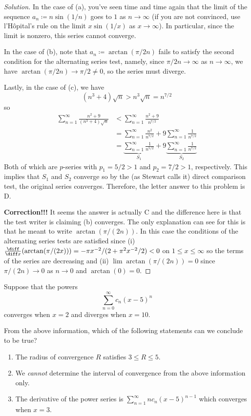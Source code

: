 \begin{proof}[Solution]
In the case of (a), you've seen time and time again that the limit of the
sequence $a_n\coloneqq n\sin(1/n)$ goes to $1$ as $n\to\infty$ (if you are
not convinced, use l'Hôpital's rule on the limit $x\sin(1/x)$ as
$x\to\infty$). In particular, since the limit is nonzero, this series
cannot converge.

In the case of (b), note that $a_n\coloneqq \arctan(\pi/2 n)$ fails to
satisfy the second condition for the alternating series test, namely, since
$\pi/2n\to \infty$ as $n\to\infty$, we have $\arctan(\pi/2 n)\to\pi/2\neq
0$, so the series must diverge.

Lastly, in the case of (c), we have
\[
(n^3+4)\sqrt{n}>n^3\sqrt{n}=n^{7/2}
\]
so
\begin{align*}
\sum_{n=1}^\infty\frac{n^2+9}{(n^3+4)\sqrt{n}}
&<\sum_{n=1}^\infty\frac{n^2+9}{n^{7/2}}\\
&=\sum_{n=1}^\infty\frac{n^2}{n^{7/2}}+
9\sum_{n=1}^\infty\frac{1}{n^{7/2}}\\
&=\underbrace{\sum_{n=1}^\infty\frac{1}{n^{5/2}}}_{S_1}+
9\underbrace{\sum_{n=1}^\infty\frac{1}{n^{7/2}}}_{S_2}
\end{align*}
Both of which are $p$-series with $p_1=5/2>1$ and $p_2=7/2>1$,
respectively. This implies that $S_1$ and $S_2$ converge so by the (as
Stewart calls it) direct comparison test, the original series
converges. Therefore, the letter answer to this problem is D.

\textbf{Correction!!!} It seems the answer is actually C and the difference
here is that the test writer is claiming (b) converges. The only
explanation can see for this is that he meant to write
$\arctan(\pi/(2n))$. In this case the conditions of the alternating series
tests are satisfied since (i) $\frac{\diff}{\diff
  x}(\arctan(\pi/(2x)))=-\pi x^{-2}/(2+\pi^2 x^{-2}/2)<0$ on $1\leq
x\leq\infty$ so the terms of the series are decreasing and (ii) $\lim
\arctan(\pi/(2n))=0$ since $\pi/(2n)\to 0$ as $n\to 0$ and $\arctan(0)=0$.
\end{proof}
\begin{problem}
Suppose that the powers
\[
\sum_{n=0}^\infty c_n(x-5)^n
\]
converges when $x=2$ and diverges when $x=10$.

From the above information, which of the following statements can we
conclude to be true?
\begin{enumerate}[label=\MakeUppercase{\roman*}.]
\item The radius of convergence $R$ satisfies $3\leq R\leq 5$.
\item We \emph{cannot} determine the interval of convergence from the above
  information only.
\item The derivative of the power series is $\sum_{n=1}^\infty
  nc_n(x-5)^{n-1}$ which converges when $x=3$.
\end{enumerate}
\end{problem}
